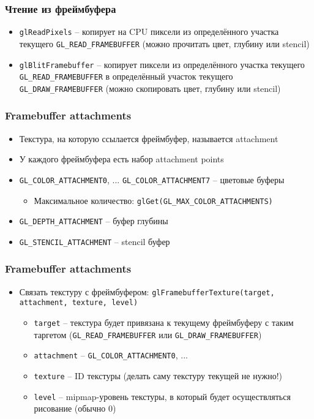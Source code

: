 \documentclass{beamer}
\begin{document}
\begin{frame}[fragile]
\frametitle{Чтение из фреймбуфера}
\begin{itemize}
\item \verb|glReadPixels| -- копирует на CPU пиксели из определённого участка текущего \verb|GL_READ_FRAMEBUFFER| (можно прочитать цвет, глубину или stencil)
\pause
\item \verb|glBlitFramebuffer| -- копирует пиксели из определённого участка текущего \verb|GL_READ_FRAMEBUFFER| в определённый участок текущего \verb|GL_DRAW_FRAMEBUFFER| (можно скопировать цвет, глубину или stencil)
\end{itemize}
\end{frame}

\begin{frame}[fragile]
\frametitle{Framebuffer attachments}
\begin{itemize}
\item Текстура, на которую ссылается фреймбуфер, называется attachment
\pause
\item У каждого фреймбуфера есть набор attachment points
\pause
\item \verb|GL_COLOR_ATTACHMENT0|, ... \verb|GL_COLOR_ATTACHMENT7| -- цветовые буферы
\pause
\begin{itemize}
\item Максимальное количество: \verb|glGet(GL_MAX_COLOR_ATTACHMENTS)|
\end{itemize}
\pause
\item \verb|GL_DEPTH_ATTACHMENT| -- буфер глубины
\item \verb|GL_STENCIL_ATTACHMENT| -- stencil буфер
\end{itemize}
\end{frame}

\begin{frame}[fragile]
\frametitle{Framebuffer attachments}
\begin{itemize}
\item Связать текстуру с фреймбуфером: \verb|glFramebufferTexture(target, attachment, texture, level)|
\pause
\begin{itemize}
\item \verb|target| -- текстура будет привязана к текущему фреймбуферу с таким таргетом (\verb|GL_READ_FRAMEBUFFER| или \verb|GL_DRAW_FRAMEBUFFER|)
\pause
\item \verb|attachment| -- \verb|GL_COLOR_ATTACHMENT0|, ...
\pause
\item \verb|texture| -- ID текстуры (делать саму текстуру текущей не нужно!)
\pause
\item \verb|level| -- mipmap-уровень текстуры, в который будет осуществляться рисование (обычно 0)
\end{itemize}
\end{itemize}
\end{frame}
\end{document}
